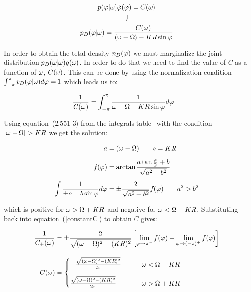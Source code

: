 \begin{gather}
    p(\varphi | \omega) \dot{\varphi}(\varphi) = C(\omega) \notag\\
    \Downarrow \notag\\
    p_D(\varphi | \omega) = \frac{C(\omega)}{(\omega - \Omega) - K R \sin \varphi}
    \label{nD}
\end{gather}

In order to obtain the total density $n_D(\varphi)$ we must marginalize the joint distribution $p_D(\omega | \omega)g(\omega)$. In
order to do that we need to find the value of $C$ as a function of $\omega$, $C(\omega)$. This can be done by using the normalization
condition $\int_{-\pi}^{\pi}p_D(\varphi | \omega)d\varphi=1$ which leads us to:

\begin{align}
    \frac{1}{C(\omega)} &= \int_{-\pi}^{\pi}\frac{1}{\omega - \Omega - K R \sin \varphi}d\varphi
    \label{constantC}
\end{align}

\noindent Using equation~(2.551-3) from the integrals table~\cite{jeffrey2007table} with the condition $|\omega-\Omega| > K R$ we get
the solution:

\begin{align}
    a&=(\omega-\Omega) \qquad b=K R \notag\\[5pt]
    f(\varphi) &= \arctan\frac{a\tan \frac{\varphi}{2}+b}{\sqrt{a^2-b^2}} \notag\\[5pt]
    \int\frac{1}{\pm a-b\sin \varphi}d\varphi &= \pm\frac{2}{\sqrt{a^2-b^2}}f(\varphi) \qquad a^2 > b^2 \notag
\end{align}

\noindent which is positive for $\omega > \Omega + K R$ and negative for $\omega < \Omega - K R$. Substituting back into
equation~(\ref{constantC}) to obtain $C$ gives:

\begin{align}
    \frac{1}{C_\pm(\omega)} &= \pm\frac{2}{\sqrt{(\omega-\Omega)^2 - (K R)^2}} \left[ \lim_{\varphi \to \pi^-} f(\varphi) - \lim_{\varphi \to (-\pi)^+} f(\varphi) \right] \notag\\[10pt]
    C(\omega) &=
    \begin{cases}
        -\frac{\sqrt{(\omega-\Omega)^2 - (K R)^2}}{2\pi} \qquad &\omega < \Omega - K R \\[10pt]
        \frac{\sqrt{(\omega-\Omega)^2 - (K R)^2}}{2\pi} \qquad &\omega > \Omega + K R
    \end{cases}
    \label{constant}
\end{align}


